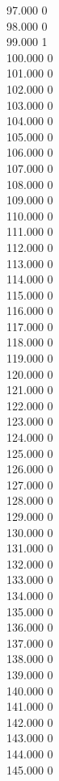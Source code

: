 { 97.000	0 \\
 98.000	0 \\
 99.000	1 \\
 100.000	0 \\
 101.000	0 \\
 102.000	0 \\
 103.000	0 \\
 104.000	0 \\
 105.000	0 \\
 106.000	0 \\
 107.000	0 \\
 108.000	0 \\
 109.000	0 \\
 110.000	0 \\
 111.000	0 \\
 112.000	0 \\
 113.000	0 \\
 114.000	0 \\
 115.000	0 \\
 116.000	0 \\
 117.000	0 \\
 118.000	0 \\
 119.000	0 \\
 120.000	0 \\
 121.000	0 \\
 122.000	0 \\
 123.000	0 \\
 124.000	0 \\
 125.000	0 \\
 126.000	0 \\
 127.000	0 \\
 128.000	0 \\
 129.000	0 \\
 130.000	0 \\
 131.000	0 \\
 132.000	0 \\
 133.000	0 \\
 134.000	0 \\
 135.000	0 \\
 136.000	0 \\
 137.000	0 \\
 138.000	0 \\
 139.000	0 \\
 140.000	0 \\
 141.000	0 \\
 142.000	0 \\
 143.000	0 \\
 144.000	0 \\
 145.000	0 \\
}
